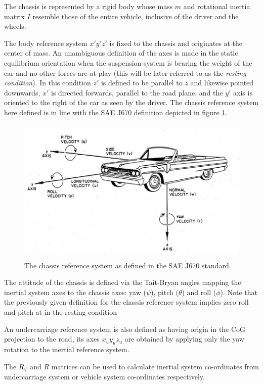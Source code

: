 The chassis is represented by a rigid body whose mass $m$ and rotational inertia matrix $I$ resemble those of the entire vehicle, inclusive of the driver and the wheels.

The body reference system $x'y'z'$ is fixed to the chassis and originates at the center of mass. An unambiguous definition of the axes is made in the static equilibrium orientation when the suspension system is bearing the weight of the car and no other forces are at play (this will be later referred to as the \textit{resting condition}). In this condition $z'$ is defined to be parallel to $z$ and likewise pointed downwards, $x'$ is directed forwards, parallel to the road plane, and the $y'$ axis is oriented to the right of the car as seen by the driver. The chassis reference system here defined is in line with the SAE J670\cite{j670} definition depicted in figure \ref{saeaxes}.
\begin{figure}[ht]
  \centering
  \includegraphics[height = 7cm]{images/saeaxes}
  \caption{The chassis reference system as defined in the SAE J670 standard.}
  \label{saeaxes}
\end{figure}

The attitude of the chassis is defined via the Tait-Bryan angles mapping the inertial system axes to the chassis axes: yaw ($\psi$), pitch ($\theta$) and roll ($\phi$).  Note that the previously given definition for the chassis reference system implies zero roll and pitch at in the resting condition

An undercarriage reference system is also defined as having origin in the CoG projection to the road, its axes $x_uy_uz_u$ are obtained by applying only the yaw rotation to the inertial reference system.

The $R_\psi$ and $R$ matrices can be used to calculate inertial system co-ordinates from undercarriage system or vehicle system co-ordinates respectively.

